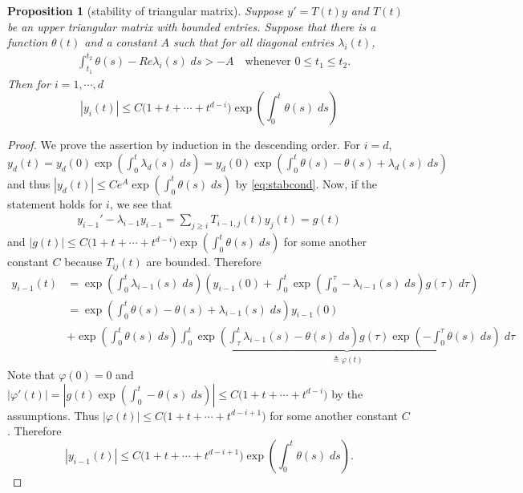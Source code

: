 \documentclass[a4paper,11pt]{article}
\newtheorem{proposition}{Proposition}[section]
\theoremstyle{remark}
\begin{document}
 \begin{proposition}[stability of triangular matrix] \label{prop:tri-stab}
 Suppose $y' = T(t) y$ and $T(t)$ be an upper triangular matrix with bounded entries. Suppose that there is a function $\theta(t)$ and a constant $A$ such that for all diagonal entries $\lambda_i(t)$,
 \begin{align} \label{eq:stabcond}
  &\int_{t_1}^{t_2} \theta(s)-Re\lambda_i(s)\; ds > -A \quad \text{whenever $0\le t_1 \le t_2$.}
 \end{align}
 Then for $i=1,\cdots,d$
 \begin{equation} \label{eq:triestim}
|y_{i}(t)| \le C\big( 1 + t + \cdots + t^{d-i}\big) \exp\left( \int_0^t \theta(s)\;ds\right)%
 \end{equation}
\end{proposition}
\begin{proof}
 We prove the assertion by induction in the descending order. For $i=d$, $y_d(t)=y_d(0)\exp\left( \int_0^t \lambda_d(s)\;ds\right)=y_d(0)\exp\left( \int_0^t \theta(s)-\theta(s)+\lambda_d(s)\;ds\right)$ and thus $|y_d(t)| \le Ce^A\exp\left( \int_0^t \theta(s)\;ds\right)$ by \eqref{eq:stabcond}. Now, if the statement holds for $i$, we see that
 \begin{align*}
  y_{i-1}' -\lambda_{i-1}y_{i-1} = \sum_{j\ge i} T_{i-1,j}(t)y_j(t) = g(t)
 \end{align*}
 and $|g(t)| \le C\big( 1 + t + \cdots + t^{d-i}\big) \exp\left( \int_0^t \theta(s)\;ds\right)$ for some another constant $C$ because $T_{ij}(t)$ are bounded. Therefore
 \begin{align*}
  y_{i-1}(t) &= \exp\left( \int_0^t \lambda_{i-1}(s)\;ds\right) \left(y_{i-1}(0) + \int_0^t \exp\left( \int_0^\tau -\lambda_{i-1}(s)\;ds\right)g(\tau) \; d\tau\right)\\
  &=\exp\left( \int_0^t \theta(s)-\theta(s)+\lambda_{i-1}(s)\;ds\right) y_{i-1}(0) \\
  &+ \exp\left( \int_0^t \theta(s)\;ds\right)\underbrace{\int_0^t \exp\left( \int_\tau^t \lambda_{i-1}(s)-\theta(s)\;ds\right)g(\tau)\exp\left( -\int_0^\tau \theta(s)\;ds\right) \; d\tau}_{\triangleq \varphi(t)}
  \end{align*}
 Note that $\varphi(0)=0$ and $|\varphi'(t)| = \left|g(t)\exp\left( \int_0^t -\theta(s)\;ds\right)\right|\le C\big( 1 + t + \cdots + t^{d-i}\big)$ by the assumptions. Thus $|\varphi(t)|\le C\big( 1 + t + \cdots + t^{d-i+1}\big)$ for some another constant $C$. Therefore
 $$|y_{i-1}(t)| \le C\big( 1 + t + \cdots + t^{d-i+1}\big)\exp\left( \int_0^t \theta(s)\;ds\right).$$
\end{proof}
\end{document}
